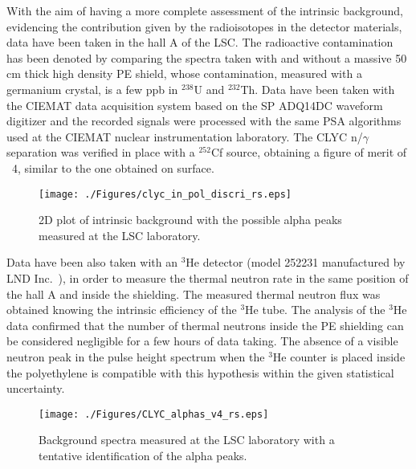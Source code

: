 \documentclass[review,number,sort&compress]{elsarticle}
\begin{document}
With the aim of having a more complete assessment of the intrinsic background, evidencing the contribution given by the radioisotopes in the detector materials, data have been taken in the hall A of the LSC. The radioactive contamination has been denoted by comparing the spectra taken with and without a massive 50 cm thick high density PE shield, whose contamination, measured with a germanium crystal, is a few ppb in $^{238}$U and $^{232}$Th. Data have been taken with the CIEMAT data acquisition system based on the SP ADQ14DC waveform digitizer and the recorded signals were processed with the same PSA algorithms used at the CIEMAT nuclear instrumentation laboratory. The CLYC n/$\gamma$ separation was verified in place with a $^{252}$Cf source, obtaining a figure of merit of ~4, similar to the one obtained on surface.

\begin{figure}[h!]
\centering
\texttt{[image: ./Figures/clyc\_in\_pol\_discri\_rs.eps]}
\caption{2D plot of intrinsic background with the possible alpha peaks measured at the LSC laboratory.}
\label{intbckg}
\end{figure}

Data have been also taken with an $^{3}$He detector (model 252231 manufactured by LND Inc.~\cite{LND}), in order to measure the thermal neutron rate in the same position of the hall A and inside the shielding. The measured thermal neutron flux was obtained knowing the intrinsic efficiency of the $^{3}$He tube. The analysis of the $^{3}$He data confirmed that the number of thermal neutrons inside the PE shielding can be considered negligible for a few hours of data taking. The absence of a visible neutron peak in the pulse height spectrum when the $^{3}$He counter is placed inside the polyethylene is compatible with this hypothesis within the given statistical uncertainty.

\begin{figure}[h!]
\centering
\texttt{[image: ./Figures/CLYC\_alphas\_v4\_rs.eps]}
\caption{Background spectra measured at the LSC laboratory with a tentative identification of the alpha peaks.}
\label{alph}
\end{figure}
\end{document}
